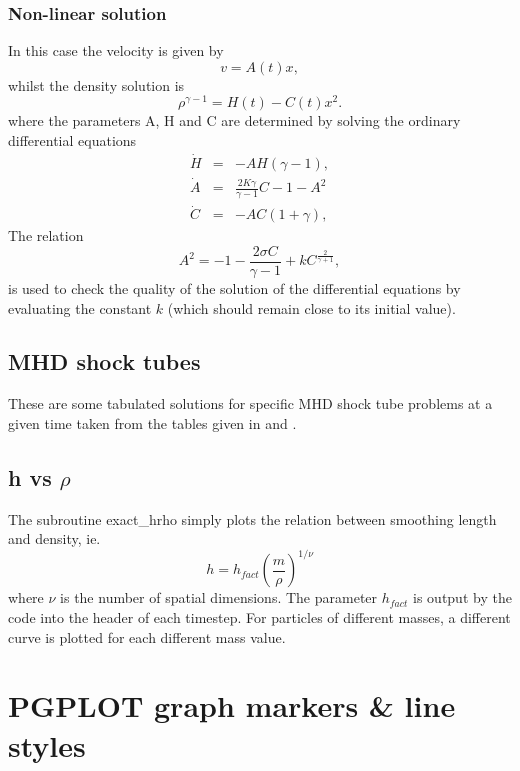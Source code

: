 \documentclass[a4paper,12pt]{article}
\begin{document}
\subsubsection{Non-linear solution}
In this case the velocity is given by
\begin{equation}
v = A(t) x,
\end{equation}
whilst the density solution is
\begin{equation}
\rho^{\gamma -1} = H(t) - C(t) x^2.
\end{equation}
where the parameters A, H and C are determined by solving the ordinary
differential equations
\begin{eqnarray}
\dot{H} & = & -AH(\gamma -1), \\
\dot{A} & = & \frac{2K \gamma}{\gamma -1} C - 1 - A^2 \\
\dot{C} & = & -AC(1+ \gamma),
\end{eqnarray}
The relation
\begin{equation}
A^2 = -1 - \frac{2 \sigma C}{\gamma -1} + kC^{\frac{2}{\gamma +1}},
\label{eq:kconst}
\end{equation}
is used to check the quality of the solution of the differential equations by
evaluating the constant $k$ (which should remain close to its initial value).

\subsection{MHD shock tubes}
 These are some tabulated solutions for specific MHD shock tube problems at a
given time taken from the tables given in \citet{dw94} and \citet{rj95}.

\subsection{h vs $\rho$}
 The subroutine exact\_hrho simply plots the relation between smoothing length
and density, ie.
\begin{equation}
h = h_{fact} \left(\frac{m}{\rho}\right)^{1/\nu}
\end{equation}
where $\nu$ is the number of spatial dimensions. The parameter $h_{fact}$ is
output by the code into the header of each timestep. For particles of different
masses, a different curve is plotted for each different mass value.

\newpage
\section{PGPLOT graph markers \& line styles}

\newpage



\end{document}

